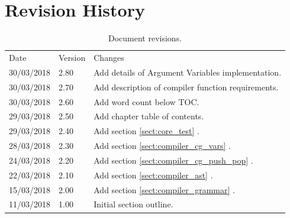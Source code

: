 \documentclass[11pt,a4paper]{report}
\begin{document}
\pagestyle{plain}

\section*{Revision History}
\begin{table}[h]
\def\arraystretch{1.5}
    \begin{tabularx}{\textwidth}{|l|l|X|}
    \hline
    Date & Version & Changes \\
    \arrayrulecolor{blue9}
	\specialrule{2pt}{-2pt}{0pt}
	30/03/2018 & 2.80 & Add details of Argument Variables implementation. \\ \hline
	30/03/2018 & 2.70 & Add description of compiler function requirements. \\ \hline
	30/03/2018 & 2.60 & Add word count below TOC. \\ \hline
	29/03/2018 & 2.50 & Add chapter table of contents. \\ \hline
	29/03/2018 & 2.40 & Add section \ref{sect:core_test} \nameref{sect:core_test}. \\ \hline
	28/03/2018 & 2.30 & Add section \ref{sect:compiler_cg_vars} \nameref{sect:compiler_cg_vars}. \\ \hline
	24/03/2018 & 2.20 & Add section \ref{sect:compiler_cg_push_pop} \nameref{sect:compiler_cg_push_pop}. \\ \hline
	22/03/2018 & 2.10 & Add section \ref{sect:compiler_ast} \nameref{sect:compiler_ast}. \\ \hline
	15/03/2018 & 2.00 & Add section \ref{sect:compiler_grammar} \nameref{sect:compiler_grammar}. \\ \hline
	11/03/2018 & 1.00 & Initial section outline. \\ \hline
    \end{tabularx}
    \caption{Document revisions.}
\end{table}
\newpage
\end{document}
